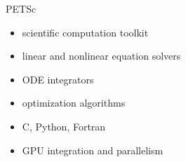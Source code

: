\documentclass[aspectratio=169]{beamer}
\begin{document}

\begin{frame}{\Large PETSc}
  \Large
  \begin{itemize}
    \item scientific computation toolkit
    \item linear and nonlinear equation solvers
    \item ODE integrators
    \item optimization algorithms
    \item C, Python, Fortran
    \item GPU integration and parallelism
  \end{itemize}
\end{frame}
\end{document}
